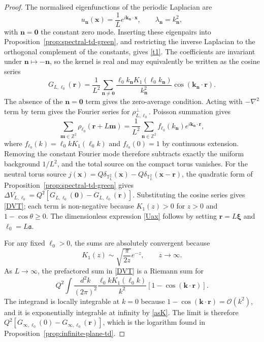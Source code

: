 \documentclass[nopacs,amsmath,amsfonts,amssymb,aps,superscriptaddress]{revtex4}
\begin{document}
\begin{proof}
The normalised eigenfunctions of the periodic Laplacian are
\begin{equation}
  u_{\mathbf n}(\mathbf x)=\frac{1}{L}e^{i\mathbf k_{\mathbf n}\cdot\mathbf x},
  \qquad
  \lambda_{\mathbf n}=k_{\mathbf n}^2,
\end{equation}
with \(\mathbf n=\mathbf 0\) the constant zero mode. Inserting these eigenpairs into Proposition~\ref{prop:spectral-td-green}, and restricting the inverse Laplacian to the orthogonal complement of the constants, gives \eqref{t1}. The coefficients are invariant under \(\mathbf n\mapsto-\mathbf n\), so the kernel is real and may equivalently be written as the cosine series
\begin{equation}
  G_{L,\ell_0}(\mathbf r)=\frac{1}{L^2}\sum_{\mathbf n\neq\mathbf 0}
  \frac{\ell_0 k_{\mathbf n}K_1(\ell_0 k_{\mathbf n})}{k_{\mathbf n}^2}
  \cos(\mathbf k_{\mathbf n}\cdot\mathbf r).
\end{equation}
The absence of the \(\mathbf n=\mathbf 0\) term gives the zero-average condition. Acting with \(-\nabla^2\) term by term gives the Fourier series for \(\rho_{L,\ell_0}^{\perp}\). Poisson summation gives
\begin{equation}
  \sum_{\mathbf m\in\mathbb Z^2}\rho_{\ell_0}(\mathbf r+L\mathbf m)
  =\frac{1}{L^2}\sum_{\mathbf n\in\mathbb Z^2}f_{\ell_0}(k_{\mathbf n})e^{i\mathbf k_{\mathbf n}\cdot\mathbf r},
\end{equation}
where \(f_{\ell_0}(k)=\ell_0 kK_1(\ell_0 k)\) and \(f_{\ell_0}(0)=1\) by continuous extension. Removing the constant Fourier mode therefore subtracts exactly the uniform background \(1/L^2\), and the total source on the compact torus vanishes. For the neutral torus source \(j(\mathbf x)=Q\delta_{\mathbb T_L^2}(\mathbf x)-Q\delta_{\mathbb T_L^2}(\mathbf x-\mathbf r)\), the quadratic form of Proposition~\ref{prop:spectral-td-green} gives \(\Delta V_{L,\ell_0}=Q^2[G_{L,\ell_0}(\mathbf 0)-G_{L,\ell_0}(\mathbf r)]\). Substituting the cosine series gives \eqref{DVT}; each term is non-negative because \(K_1(z)>0\) for \(z>0\) and \(1-\cos\theta\geq0\). The dimensionless expression \eqref{Uax} follows by setting \(\mathbf r=L\boldsymbol{\xi}\) and \(\ell_0=L\mathfrak a\).

For any fixed \(\ell_0>0\), the sums are absolutely convergent because \cite{Abramowitz1972}
\begin{equation}\label{asK}
  K_1(z)\sim\sqrt{\frac{\pi}{2z}}e^{-z},\qquad z\to\infty .
\end{equation}
As \(L\to\infty\), the prefactored sum in \eqref{DVT} is a Riemann sum for
\begin{equation}
  Q^2\int\frac{d^2k}{(2\pi)^2}\frac{\ell_0 kK_1(\ell_0 k)}{k^2}
  \left[1-\cos(\mathbf k\cdot\mathbf r)\right].
\end{equation}
The integrand is locally integrable at \(k=0\) because \(1-\cos(\mathbf k\cdot\mathbf r)=\mathcal O(k^2)\), and it is exponentially integrable at infinity by \eqref{asK}. The limit is therefore \(Q^2[G_{\infty,\ell_0}(0)-G_{\infty,\ell_0}(\mathbf r)]\), which is the logarithm found in Proposition~\ref{prop:infinite-plane-td}.
\end{proof}
\end{document}
